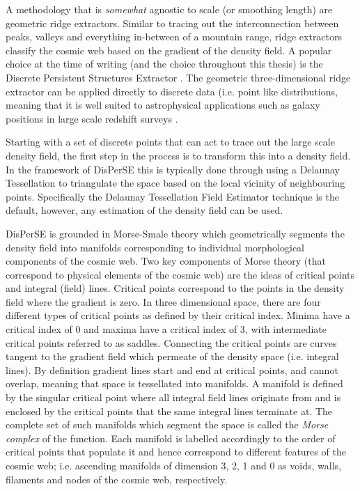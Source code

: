 A methodology that is \textit{somewhat} agnostic to scale (or smoothing length) are geometric ridge extractors. Similar to tracing out the interconnection between peaks, valleys and everything in-between of a mountain range, ridge extractors classify the cosmic web based on the gradient of the density field. A popular choice at the time of writing (and the choice throughout this thesis) is the Discrete Persistent Structures Extractor \citep[DisPerSE][]{sousbie2011a, sousbie2011b}. The geometric three-dimensional ridge extractor can be applied directly to discrete data (i.e. point like distributions, meaning that it is well suited to astrophysical applications such as galaxy positions in large scale redshift surveys \citep[e.g.][]{malavasi2017, kraljic2018}.

Starting with a set of discrete points that can act to trace out the large scale density field, the first step in the process is to transform this into a density field. In the framework of DisPerSE this is typically done through using a Delaunay Tessellation to triangulate the space based on the local vicinity of neighbouring points. Specifically the Delaunay Tessellation Field Estimator technique \citep[DTFE;][]{schaap2000, cautun2011} is the default, however, any estimation of the density field can be used. 

DisPerSE is grounded in Morse-Smale theory which geometrically segments the density field into manifolds corresponding to individual morphological components of the cosmic web. Two key components of Morse theory (that correspond to physical elements of the cosmic web) are the ideas of critical points and integral (field) lines.  Critical points correspond to the points in the density field where the gradient is zero. In three dimensional space, there are four different types of critical points as defined by their critical index. Minima have a critical index of 0 and maxima have a critical index of 3, with intermediate critical points referred to as saddles. Connecting the critical points are curves tangent to the gradient field which permeate of the density space (i.e. integral lines). By definition gradient lines start and end at critical points, and cannot overlap, meaning that space is tessellated into manifolds. A manifold is defined by the singular critical point where all integral field lines originate from and is enclosed by the critical points that the same integral lines terminate at. The complete set of such manifolds which segment the space is called the \textit{Morse complex} of the function. Each manifold is labelled accordingly to the order of critical points that populate it and hence correspond to different features of the cosmic web; i.e. ascending manifolds of dimension 3, 2, 1 and 0 as voids, walls, filaments and nodes of the cosmic web, respectively. 

